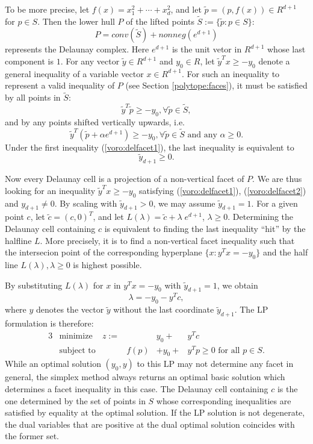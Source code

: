 \documentclass[[a4paper,12pt]{article}
\begin{document}
To be more precise, let 
$f(x) = x_1^2 + \cdots + x_d^2$, and let $\tilde{p}= (p, f(x)) \in R^{d+1}$
for $p \in S$.    Then the lower hull $P$ of the lifted points
 $\tilde{S}:=\{\tilde{p}:  p\in S\}$:
\[
P =  conv(\tilde{S}) + nonneg(e^{d+1})
\]
represents the Delaunay complex. 
Here $e^{d+1}$ is the unit vetor in $R^{d+1}$ whose last component is $1$.
For any vector $\tilde{y} \in R^{d+1}$ and $y_0 \in R$, 
let $\tilde{y}^T x \ge -y_0$ denote a general inequality of a variable
vector $x \in R^{d+1}$.  For such an inequality
to represent a valid inequality of $P$ (see Section \ref{polytope:faces}), 
it must be satisfied by all points in $\tilde{S}$:
\begin{equation} \label{voro:delfacet1}
 \tilde{y}^T \tilde{p} \ge -y_0, \forall \tilde{p} \in \tilde{S},
\end{equation}
and by any points shifted vertically upwards, i.e.
\[
 \tilde{y}^T ( \tilde{p} + \alpha e^{d+1})
\ge -y_0, \forall \tilde{p} \in \tilde{S} \text{ and any } \alpha \ge 0.
\]
\noindent
Under the first inequality (\ref{voro:delfacet1}), 
the last inequality is equivalent to 
\begin{equation} \label{voro:delfacet2}
 \tilde{y}_{d+1} \ge 0.
\end{equation}

\noindent
Now every Delaunay cell
is a projection of a non-vertical facet of $P$.  We are thus looking
for an inequality $\tilde{y}^T x \ge -y_0$ satisfying
(\ref{voro:delfacet1}), (\ref{voro:delfacet2}) and $y_{d+1}\neq 0$.
By scaling with $\tilde{y}_{d+1}>0$, we may assume $\tilde{y}_{d+1} = 1$.
For a given point $c$, let $\tilde{c} = (c, 0)^T$, and let
$L(\lambda)= \tilde{c} + \lambda \; e^{d+1}$, $\lambda \ge 0$.
Determining the Delaunay cell containing $c$
is equivalent to finding the last inequality ``hit'' by the halfline
$L$.  More precisely, it is to find a non-vertical facet inequality
such that the intersecion point of the corresponding hyperplane
$\{ x :  y^T x = -y_0\}$ and the half line $L(\lambda), \lambda \ge 0$
is highest possible.  

By substituting $L(\lambda)$ for $x$ in $y^T x = -y_0$ with
$\tilde{y}_{d+1} = 1$, we obtain
\[
 \lambda = -y_0 - y^T c,
\]
where $y$ denotes the vector $\tilde{y}$ without the last coordinate
$\tilde{y}_{d+1}$.  The LP formulation is therefore:
\begin{alignat}{3} \label{eq:dela_celllp}
&\text{minimize}  
  &  z :=  &       &   y_0 + & y^T c \\
&\text{subject to}  
  &        & f(p) & + y_0 +  &y^T p \ge 0 \text{ for all }  p \in S.  \nonumber
\end{alignat}
While an optimal solution $(y_0, y)$ to this LP may not determine
any facet in general, the simplex method always returns an optimal
basic solution which determines a facet inequality in this case.
The Delaunay cell containing $c$ is the one determined by 
the set of points in $S$ whose corresponding inequalities
are satisfied by equality at the optimal solution.  If the LP
solution is not degenerate, the dual variables that are positive
at the dual optimal solution coincides with the former set.
\end{document}

